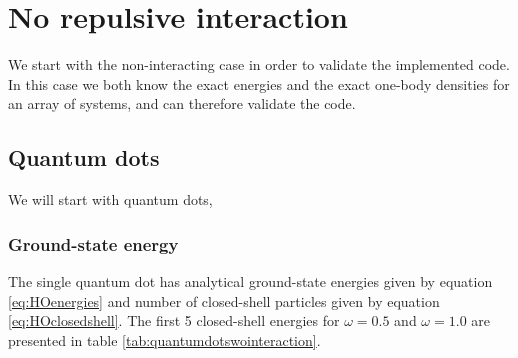 \newpage
\section{No repulsive interaction}
We start with the non-interacting case in order to validate the implemented code. In this case we both know the exact energies and the exact one-body densities for an array of systems, and can therefore validate the code.

\subsection{Quantum dots}
We will start with quantum dots, 

\subsubsection{Ground-state energy}
The single quantum dot has analytical ground-state energies given by equation \eqref{eq:HOenergies} and number of closed-shell particles given by equation \eqref{eq:HOclosedshell}. The first 5 closed-shell energies for $\omega=0.5$ and $\omega=1.0$ are presented in table \eqref{tab:quantumdotswointeraction}.

